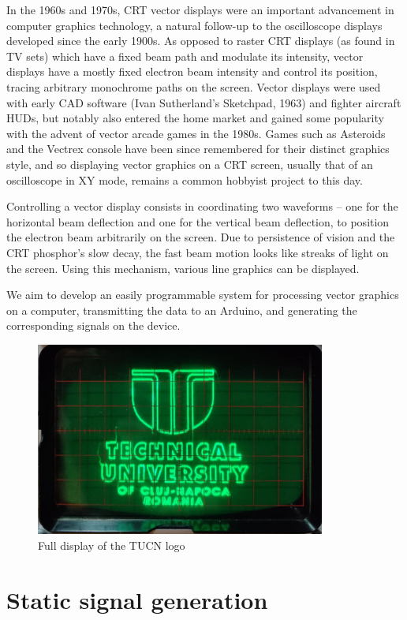 \documentclass[12pt]{article}
\begin{document}
In the 1960s and 1970s, CRT vector displays were an important advancement in computer graphics technology, a natural follow-up to the oscilloscope displays developed since the early 1900s. As opposed to raster CRT displays (as found in TV sets) which have a fixed beam path and modulate its intensity, vector displays have a mostly fixed electron beam intensity and control its position, tracing arbitrary monochrome paths on the screen. Vector displays were used with early CAD software (Ivan Sutherland's Sketchpad, 1963) and fighter aircraft HUDs, but notably also entered the home market and gained some popularity with the advent of vector arcade games in the 1980s. Games such as Asteroids and the Vectrex console have been since remembered for their distinct graphics style, and so displaying vector graphics on a CRT screen, usually that of an oscilloscope in XY mode, remains a common hobbyist project to this day.

Controlling a vector display consists in coordinating two waveforms -- one for the horizontal beam deflection and one for the vertical beam deflection, to position the electron beam arbitrarily on the screen. Due to persistence of vision and the CRT phosphor's slow decay, the fast beam motion looks like streaks of light on the screen. Using this mechanism, various line graphics can be displayed.

We aim to develop an easily programmable system for processing vector graphics on a computer, transmitting the data to an Arduino, and generating the corresponding signals on the device. 

\newpage
\begin{figure}[h]
\centering
\includegraphics[width=0.85\textwidth]{images/demo-tucn.png}
\caption{Full display of the TUCN logo}
\end{figure}
\section{Static signal generation}
\end{document}

